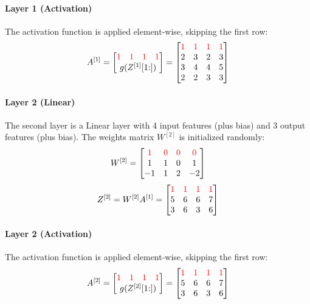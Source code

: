 \paragraph{Layer 1 (Activation)} The activation function is applied element-wise, skipping the first row:
\begin{equation*}
    A^{[1]} = \mqty[
        \mqty{\color{red} 1 & \color{red} 1 & \color{red} 1 & \color{red} 1} \\
        g(Z^{[1]}[1\hspace{-0.6ex}:])
    ] = \mqty[
        \color{red} 1 & \color{red} 1 & \color{red} 1 & \color{red} 1 \\
        2 & 3 & 2 & 3 \\
        3 & 4 & 4 & 5 \\
        2 & 2 & 3 & 3
    ]
\end{equation*}

\paragraph{Layer 2 (Linear)} The second layer is a Linear layer with 4 input features (plus bias) and 3 output features (plus bias). The weights matrix $W^{[2]}$ is initialized randomly:
\begin{equation*}
    W^{[2]} = \mqty[
        \color{red} 1 & \color{red} 0 & \color{red} 0 & \color{red} 0\\
        1 & 1 & 0 & 1\\
        -1 & 1 & 2 & -2
    ]
\end{equation*}
\begin{equation*}
    Z^{[2]} = W^{[2]} A^{[1]} = \mqty[
        \color{red} 1 & \color{red} 1 & \color{red} 1 & \color{red} 1 \\
        5 & 6 & 6 & 7 \\
        3 & 6 & 3 & 6
    ]
\end{equation*}

\paragraph{Layer 2 (Activation)} The activation function is applied element-wise, skipping the first row:
\begin{equation*}
    A^{[2]} = \mqty[
        \mqty{\color{red} 1 & \color{red} 1 & \color{red} 1 & \color{red} 1} \\
        g(Z^{[2]}[1\hspace{-0.6ex}:])
    ] = \mqty[
        \color{red} 1 & \color{red} 1 & \color{red} 1 & \color{red} 1 \\
        5 & 6 & 6 & 7 \\
        3 & 6 & 3 & 6
    ]
\end{equation*}

